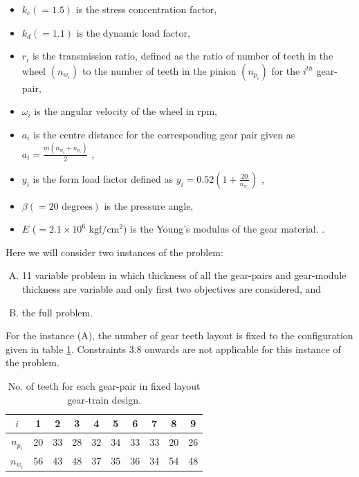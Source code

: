 \begin{singlespacing}
\begin{itemize}
\item $k_c(=1.5)$ is the stress concentration factor,
\item $k_d(=1.1)$ is the dynamic load factor,
\item $r_i$ is the transmission ratio, defined as the ratio of number 
of teeth in the wheel $(n_{w_i})$ to the number of teeth in the 
pinion $(n_{p_i})$ for the $i^{th}$ gear-pair,
\item ${\omega}_i$ is the angular velocity of the wheel in rpm,
\item $a_i$ is the centre distance for the corresponding gear pair
given as 
\\
$a_i = \frac {m ( n_{w_i} + n_{p_i})} {2}$ , 
\item $y_i$ is the form load factor defined as 
$y_i = 0.52(1+ \frac{20}{n_{w_i}} )$ , 
\item ${\beta}(= 20 \text{ degrees})$ is the pressure angle,
\item $E $ ($= 2.1 \times 10^6\text{ kgf}/\text{cm}^2$) is the Young's modulus of the gear material. .
\end{itemize}

\end{singlespacing}

Here we will consider two instances of the problem:
\begin{enumerate}[(A)]
\item 11 variable problem in which thickness of all the gear-pairs and
  gear-module thickness are variable and only first two objectives are
  considered, and
\item the full problem.
\end{enumerate}

For the instance (A), the number of gear teeth layout is fixed to the
configuration given in table \ref{gearTeeth}. Constraints 3.8 onwards are
not applicable for this instance of the problem.

\begin{table}[!ht]
  \centering
  \begin{tabular}{|c|c|c|c|c|c|c|c|c|c|}
    \hline
    $i$ & 1 & 2 & 3 & 4 & 5 & 6 & 7 & 8 & 9  \\
    \hline
    \multicolumn{1}{|c|}{$n_{p_i}$} & 20 & 33 & 28 & 32 & 34 & 33 & 33 & 20 & 26\\
    \hline
    \multicolumn{1}{|c|}{$n_{w_i}$} & 56 & 43 & 48 & 37 & 35 & 36 & 34 & 54 & 48\\
    \hline
  \end{tabular}
  \caption{No. of teeth for each gear-pair in fixed layout gear-train design.}
  \label{gearTeeth}
\end{table}





